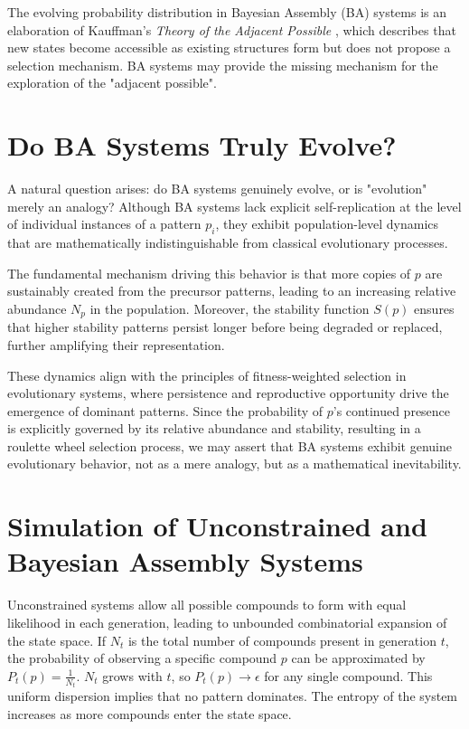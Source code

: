 \documentclass[preprint,12pt]{elsarticle}
\begin{document}
The evolving probability distribution in Bayesian Assembly (BA) systems is an elaboration of Kauffman's \emph{Theory of the Adjacent Possible} \cite{kauffman2000investigations, kauffman2024tap}, which describes that new states become accessible as existing structures form but does not propose a selection mechanism. BA systems may provide the missing mechanism for the exploration of the "adjacent possible".

\section{Do BA Systems Truly Evolve?}

A natural question arises: do BA systems genuinely evolve, or is "evolution" merely an analogy? Although BA systems lack explicit self-replication at the level of individual instances of a pattern $p_i$, they exhibit population-level dynamics that are mathematically indistinguishable from classical evolutionary processes. 

The fundamental mechanism driving this behavior is that more copies of $p$ are sustainably created from the precursor patterns, leading to an increasing relative abundance $N_p$ in the population. Moreover, the stability function $S(p)$ ensures that higher stability patterns persist longer before being degraded or replaced, further amplifying their representation. 

These dynamics align with the principles of fitness-weighted selection in evolutionary systems, where persistence and reproductive opportunity drive the emergence of dominant patterns. Since the probability of $p$'s continued presence is explicitly governed by its relative abundance and stability, resulting in a roulette wheel selection process, we may assert that BA systems exhibit genuine evolutionary behavior, not as a mere analogy, but as a mathematical inevitability.


\section{Simulation of Unconstrained and Bayesian Assembly Systems}

Unconstrained systems allow all possible compounds to form with equal likelihood in each generation, leading to unbounded combinatorial expansion of the state space. If $N_t$ is the total number of compounds present in generation $t$, the probability of observing a specific compound $p$ can be approximated by $P_t(p) = \frac{1}{N_t}$. $N_t$ grows with $t$, so $P_t(p) \to \epsilon$ for any single compound. This uniform dispersion implies that no pattern dominates. The entropy of the system increases as more compounds enter the state space.
\end{document}

